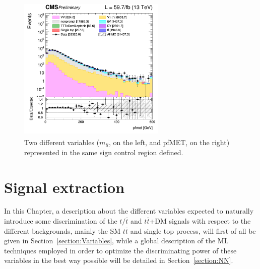 \documentclass[a4paper, 10pt, openright]{report}
\begin{document}
\begin{figure}[htbp]
{\begin{minipage}[b]{.48\textwidth}
\end{minipage}\hfill
\begin{minipage}[b]{.48\textwidth}
\includegraphics[width=7cm, height=7cm]{figs/log_cratio_SSCR_ll_METcorrected_pt_2018.png}
\end{minipage} \hfill
}
\caption{Two different variables ($m_{ll}$, on the left, and pf\ac{MET}, on the right) represented in the same sign control region defined.}
\label{fig:SSCR}
\end{figure}



























\chapter{Signal extraction} \label{section:Discrimination}

In this Chapter, a description about the different variables expected to naturally introduce some discrimination of the $t/\bar t$ and $t \bar t$+DM signals with respect to the different backgrounds, mainly the \ac{SM} $t \bar t$ and single top process, will first of all be given in Section~\ref{section:Variables}, while a global description of the \ac{ML} techniques employed in order to optimize the discriminating power of these variables in the best way possible will be detailed in Section~\ref{section:NN}.%
\end{document}
